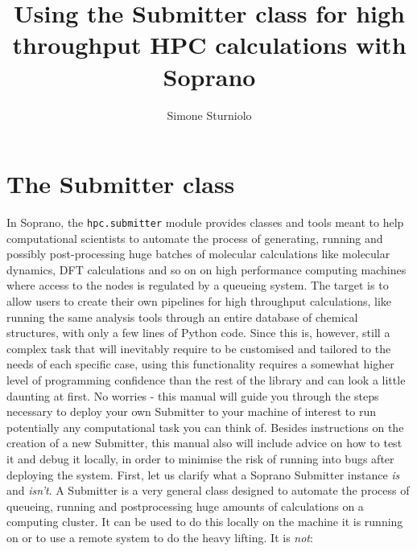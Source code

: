 \documentclass[]{report}
\title{Using the Submitter class for high throughput HPC calculations with Soprano}
\author{Simone Sturniolo}
\begin{document}
\maketitle

\chapter{The Submitter class}

In Soprano, the \lstinline|hpc.submitter| module provides classes and tools meant to help computational scientists to automate the process of generating, running and possibly post-processing huge batches of molecular calculations like molecular dynamics, DFT calculations and so on on high performance computing machines where access to the nodes is regulated by a queueing system. The target is to allow users to create their own pipelines for high throughput calculations, like running the same analysis tools through an entire database of chemical structures, with only a few lines of Python code. Since this is, however, still a complex task that will inevitably require to be customised and tailored to the needs of each specific case, using this functionality requires a somewhat higher level of programming confidence than the rest of the library and can look a little daunting at first. No worries - this manual will guide you through the steps necessary to deploy your own Submitter to your machine of interest to run potentially any computational task you can think of. Besides instructions on the creation of a new Submitter, this manual also will include advice on how to test it and debug it locally, in order to minimise the risk of running into bugs after deploying the system.\newline
First, let us clarify what a Soprano Submitter instance \textit{is} and \textit{isn't}. A Submitter is a very general class designed to automate the process of queueing, running and postprocessing huge amounts of calculations on a computing cluster. It can be used to do this locally on the machine it is running on or to use a remote system to do the heavy lifting. It is \textit{not}:
\end{document}

